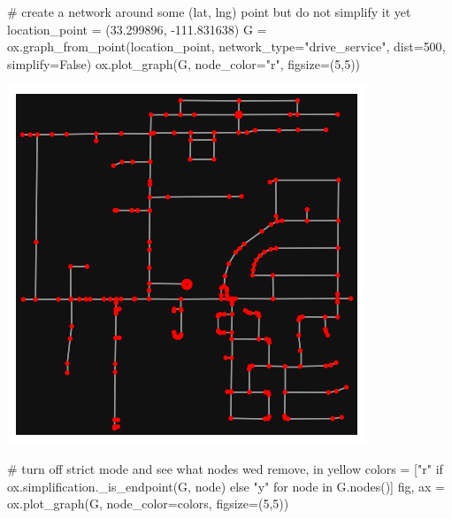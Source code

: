 \documentclass[
  letterpaper,
  DIV=11,
  numbers=noendperiod]{scrreprt}
\newenvironment{Shaded}{\begin{snugshade}}{\end{snugshade}}
\newcommand{\CommentTok}[1]{\textcolor[rgb]{0.37,0.37,0.37}{#1}}
\newcommand{\ControlFlowTok}[1]{\textcolor[rgb]{0.00,0.23,0.31}{#1}}
\newcommand{\DecValTok}[1]{\textcolor[rgb]{0.68,0.00,0.00}{#1}}
\newcommand{\FloatTok}[1]{\textcolor[rgb]{0.68,0.00,0.00}{#1}}
\newcommand{\KeywordTok}[1]{\textcolor[rgb]{0.00,0.23,0.31}{#1}}
\newcommand{\NormalTok}[1]{\textcolor[rgb]{0.00,0.23,0.31}{#1}}
\newcommand{\OperatorTok}[1]{\textcolor[rgb]{0.37,0.37,0.37}{#1}}
\newcommand{\StringTok}[1]{\textcolor[rgb]{0.13,0.47,0.30}{#1}}
\newcommand{\VariableTok}[1]{\textcolor[rgb]{0.07,0.07,0.07}{#1}}
\begin{document}
\begin{Shaded}
\begin{Highlighting}[]
\CommentTok{\# create a network around some (lat, lng) point but do not simplify it yet}
\NormalTok{location\_point }\OperatorTok{=}\NormalTok{ (}\FloatTok{33.299896}\NormalTok{, }\OperatorTok{{-}}\FloatTok{111.831638}\NormalTok{)}
\NormalTok{G }\OperatorTok{=}\NormalTok{ ox.graph\_from\_point(location\_point, network\_type}\OperatorTok{=}\StringTok{"drive\_service"}\NormalTok{, dist}\OperatorTok{=}\DecValTok{500}\NormalTok{, simplify}\OperatorTok{=}\VariableTok{False}\NormalTok{)}
\NormalTok{ox.plot\_graph(G, node\_color}\OperatorTok{=}\StringTok{"r"}\NormalTok{, figsize}\OperatorTok{=}\NormalTok{(}\DecValTok{5}\NormalTok{,}\DecValTok{5}\NormalTok{))}
\end{Highlighting}
\end{Shaded}

\includegraphics{labs/w07_OSM_files/figure-pdf/cell-15-output-1.png}

\begin{Shaded}
\begin{Highlighting}[]
\CommentTok{\# turn off strict mode and see what nodes we\textquotesingle{}d remove, in yellow}
\NormalTok{colors }\OperatorTok{=}\NormalTok{ [}\StringTok{"r"} \ControlFlowTok{if}\NormalTok{ ox.simplification.\_is\_endpoint(G, node) }\ControlFlowTok{else} \StringTok{"y"} \ControlFlowTok{for}\NormalTok{ node }\KeywordTok{in}\NormalTok{ G.nodes()]}
\NormalTok{fig, ax }\OperatorTok{=}\NormalTok{ ox.plot\_graph(G, node\_color}\OperatorTok{=}\NormalTok{colors, figsize}\OperatorTok{=}\NormalTok{(}\DecValTok{5}\NormalTok{,}\DecValTok{5}\NormalTok{))}
\end{Highlighting}
\end{Shaded}
\end{document}
